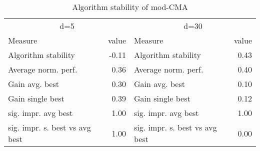 \begin{table}
\caption{Algorithm stability of mod-CMA}
\begin{tabular}{lrlr}
\toprule
\multicolumn{2}{c}{d=5} & \multicolumn{2}{c}{d=30} \\
Measure & value & Measure & value \\
\midrule
Algorithm stability & -0.11 & Algorithm stability & 0.43 \\
Average norm. perf. & 0.36 & Average norm. perf. & 0.40 \\
Gain avg. best & 0.30 & Gain avg. best & 0.10 \\
Gain single best & 0.39 & Gain single best & 0.12 \\
sig. impr. avg best & 1.00 & sig. impr. avg best & 1.00 \\
sig. impr. s. best vs avg best & 1.00 & sig. impr. s. best vs avg best & 0.00 \\
\bottomrule
\end{tabular}
\end{table}
